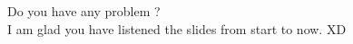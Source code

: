 \documentclass[t,compress,hyperref={colorlinks,linkcolor=OxfordBlue,urlcolor=OxfordBlue},dvipdfm]{beamer}
\begin{document}
\begin{frame}
    \begin{columns}[t]
        \begin{column}{\textwidth}
            \begin{center}
                {\Huge Do you have any problem ?}\\
                I am glad you have listened the slides from start to now. XD
            \end{center}
        \end{column}
    \end{columns}
\end{frame}
\end{document}

